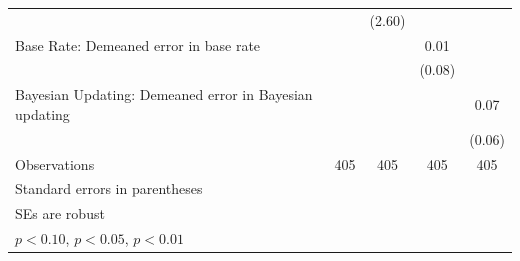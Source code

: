 \begin{table}[htbp]
\begin{tabular}{l*{4}{c}}
                &                  &   (2.60)         &                  &                  \\
Base Rate: Demeaned error in base rate&                  &                  &     0.01         &                  \\
                &                  &                  &   (0.08)         &                  \\
Bayesian Updating: Demeaned error in Bayesian updating&                  &                  &                  &     0.07         \\
                &                  &                  &                  &   (0.06)         \\
\hline
Observations    &      405         &      405         &      405         &      405         \\
\hline\hline
\multicolumn{5}{l}{\footnotesize Standard errors in parentheses}\\
\multicolumn{5}{l}{\footnotesize SEs are robust}\\
\multicolumn{5}{l}{\footnotesize \sym{*} \(p<0.10\), \sym{**} \(p<0.05\), \sym{***} \(p<0.01\)}\\
\end{tabular}
\end{table}
